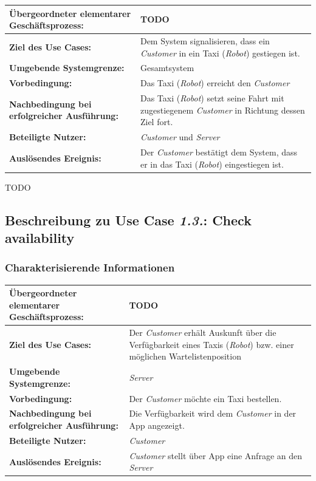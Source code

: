 				\begin{table}[H]
					\centering
					\begin{tabularx}{\textwidth}{|p{5cm}|X|}
						\hline
						\textbf{Übergeordneter elementarer Geschäftsprozess:} & TODO  \\ \hline
						\textbf{Ziel des Use Cases:} & Dem System signalisieren, dass ein \emph{Customer} in ein Taxi (\emph{Robot}) gestiegen ist. \\ \hline
						\textbf{Umgebende Systemgrenze:} & Gesamtsystem \\ \hline
						\textbf{Vorbedingung:} & Das Taxi (\emph{Robot}) erreicht den \emph {Customer} \\ \hline
						\textbf{Nachbedingung bei erfolgreicher Ausführung:} & Das Taxi (\emph{Robot}) setzt seine Fahrt mit zugestiegenem \emph{Customer} in Richtung dessen Ziel fort. \\ \hline
						\textbf{Beteiligte Nutzer:} & \emph{Customer} und \emph{Server} \\ \hline
						\textbf{Auslösendes Ereignis:} & Der \emph{Customer} bestätigt dem System, dass er in das Taxi (\emph{Robot}) eingestiegen ist. \\
						\hline
					\end{tabularx}
				\end{table}
				
				TODO
		
			\subsection*{Beschreibung zu Use Case \emph{1.3.}: Check availability}
				\subsubsection*{Charakterisierende Informationen}
				
				\begin{table}[H]
					\centering
					\begin{tabularx}{\textwidth}{|p{5cm}|X|}
						\hline
						\textbf{Übergeordneter elementarer Geschäftsprozess:} & TODO  \\ \hline
						\textbf{Ziel des Use Cases:} & Der \emph{Customer} erhält Auskunft über die Verfügbarkeit eines Taxis (\emph{Robot}) bzw. einer möglichen Wartelistenposition \\ \hline
						\textbf{Umgebende Systemgrenze:} & \emph{Server} \\ \hline
						\textbf{Vorbedingung:} & Der \emph{Customer} möchte ein Taxi bestellen. \\ \hline
						\textbf{Nachbedingung bei erfolgreicher Ausführung:} & Die Verfügbarkeit wird dem \emph{Customer} in der App angezeigt. \\ \hline
						\textbf{Beteiligte Nutzer:} & \emph{Customer} \\ \hline
						\textbf{Auslösendes Ereignis:} & \emph{Customer} stellt über App eine Anfrage an den \emph{Server} \\
						\hline
					\end{tabularx}
				\end{table}
				
